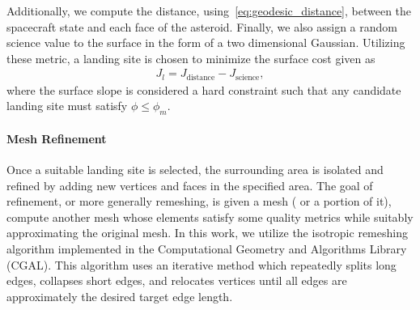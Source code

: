 \documentclass[journal]{new-aiaa}
\begin{document}
Additionally, we compute the distance, using~\cref{eq:geodesic_distance}, between the spacecraft state and each face of the asteroid. 
Finally, we also assign a random science value to the surface in the form of a two dimensional Gaussian.
Utilizing these metric, a landing site is chosen to minimize the surface cost given as
\begin{align}\label{eq:surface_cost}
    J_l =  J_{\text{distance}} - J_{\text{science}},
\end{align}
where the surface slope is considered a hard constraint such that any candidate landing site must satisfy \( \phi \leq \phi_m \).

\paragraph{Mesh Refinement}\label{sec:refinement}

Once a suitable landing site is selected, the surrounding area is isolated and refined by adding new vertices and faces in the specified area.
The goal of refinement, or more generally remeshing, is given a mesh ( or a portion of it), compute another mesh whose elements satisfy some quality metrics while suitably approximating the original mesh.
In this work, we utilize the isotropic remeshing algorithm implemented in the Computational Geometry and Algorithms Library (CGAL).
This algorithm uses an iterative method which repeatedly splits long edges, collapses short edges, and relocates vertices until all edges are approximately the desired target edge length.
\end{document}
